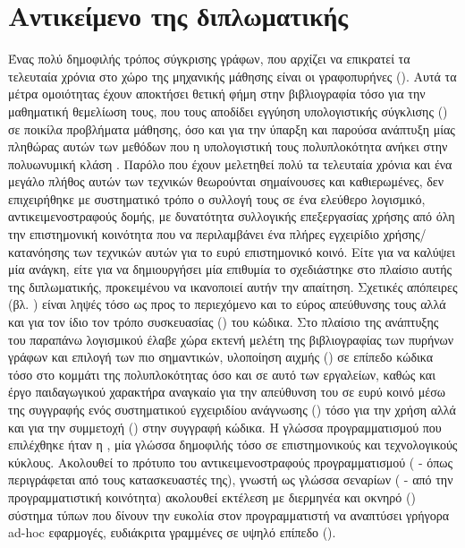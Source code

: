 \section{Αντικείμενο της διπλωματικής}
Ένας πολύ δημοφιλής τρόπος σύγκρισης γράφων, που αρχίζει να επικρατεί τα τελευταία χρόνια στο χώρο της μηχανικής μάθησης είναι οι γραφοπυρήνες ().
Αυτά τα μέτρα ομοιότητας έχουν αποκτήσει θετική φήμη στην βιβλιογραφία τόσο για την μαθηματική θεμελίωση τους, που τους αποδίδει εγγύηση υπολογιστικής σύγκλισης () σε ποικίλα προβλήματα μάθησης, όσο και για την ύπαρξη και παρούσα ανάπτυξη μίας πληθώρας αυτών των μεθόδων που η υπολογιστική τους πολυπλοκότητα ανήκει στην πολυωνυμική κλάση .
Παρόλο που έχουν μελετηθεί πολύ τα τελευταία χρόνια και ένα μεγάλο πλήθος αυτών των τεχνικών θεωρούνται σημαίνουσες και καθιερωμένες, δεν επιχειρήθηκε με συστηματικό τρόπο ο συλλογή τους σε ένα ελεύθερο λογισμικό, αντικειμενοστραφούς δομής, με δυνατότητα συλλογικής επεξεργασίας χρήσης από όλη την επιστημονική κοινότητα που να περιλαμβάνει ένα πλήρες εγχειρίδιο χρήσης/κατανόησης των τεχνικών αυτών για το ευρύ επιστημονικό κοινό.
Είτε για να καλύψει μία ανάγκη, είτε για να δημιουργήσει μία επιθυμία το \textbf{} σχεδιάστηκε στο πλαίσιο αυτής της διπλωματικής, προκειμένου να ικανοποιεί αυτήν την απαίτηση.
Σχετικές απόπειρες (βλ. \cite{sugiyama2017graphkernels}) είναι ληψές τόσο ως προς το περιεχόμενο και το εύρος απεύθυνσης τους αλλά και για τον ίδιο τον τρόπο συσκευασίας () του κώδικα.
Στο πλαίσιο της ανάπτυξης του παραπάνω λογισμικού έλαβε χώρα εκτενή μελέτη της βιβλιογραφίας των πυρήνων γράφων και επιλογή των πιο σημαντικών, υλοποίηση αιχμής () σε επίπεδο κώδικα τόσο στο κομμάτι της πολυπλοκότητας όσο και σε αυτό των εργαλείων, καθώς και έργο παιδαγωγικού χαρακτήρα αναγκαίο για την απεύθυνση του σε ευρύ κοινό μέσω της συγγραφής ενός συστηματικού εγχειριδίου ανάγνωσης () τόσο για την χρήση αλλά και για την συμμετοχή () στην συγγραφή κώδικα.
Η γλώσσα προγραμματισμού που επιλέχθηκε ήταν η , μία γλώσσα δημοφιλής τόσο σε επιστημονικούς και τεχνολογικούς κύκλους.
Ακολουθεί το πρότυπο του αντικειμενοστραφούς προγραμματισμού ( - όπως περιγράφεται από τους κατασκευαστές της), γνωστή ως γλώσσα σεναρίων ( - από την προγραμματιστική κοινότητα) ακολουθεί εκτέλεση με διερμηνέα και οκνηρό () σύστημα τύπων που δίνουν την ευκολία στον προγραμματιστή να αναπτύσει γρήγορα ad-hoc εφαρμογές, ευδιάκριτα γραμμένες σε υψηλό επίπεδο ().
